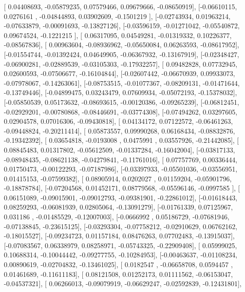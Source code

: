 \documentclass{article}
\begin{document}
       [ 0.04408693, -0.05879235,  0.07579466,  0.09679666, -0.08650919],
       [-0.06610115,  0.0276161 , -0.04844893,  0.03902609, -0.1501219 ],
       [-0.02743934,  0.01963214, -0.07633879, -0.00091693, -0.13827126],
       [-0.03596159, -0.01271042, -0.05540872,  0.09674524, -0.1221215 ],
       [ 0.06317095,  0.04549281, -0.01319332,  0.10226377, -0.08567836],
       [ 0.00963604, -0.08936962, -0.05650084,  0.06263593, -0.08617952],
       [-0.01554744, -0.01392424,  0.04649905, -0.06367932, -0.13167919],
       [-0.02348427, -0.06900281, -0.02889539, -0.03105303, -0.17932257],
       [ 0.09482828,  0.07732945,  0.02600593, -0.07506677, -0.16104844],
       [-0.02607442, -0.06670939,  0.09933073, -0.07978067, -0.14263061],
       [-0.08753515, -0.01077367, -0.08209131, -0.01471644, -0.13749446],
       [-0.04899475,  0.03243479,  0.07609934, -0.05072193, -0.15378032],
       [-0.05850539,  0.05173632, -0.08693615, -0.00120386, -0.09265239],
       [-0.06812451, -0.02929201, -0.00780868, -0.08446691, -0.03774308],
       [-0.07494262,  0.03297605,  0.02904578,  0.07016306, -0.09430818],
       [ 0.04134172,  0.07122572, -0.06461263, -0.09448824, -0.20211414],
       [ 0.05873557,  0.09990268,  0.06168434, -0.08832876, -0.19342392],
       [ 0.03654818, -0.0193008 ,  0.0475991 ,  0.03557926, -0.21442085],
       [ 0.08845483,  0.01317802, -0.05612509, -0.01337284, -0.16042004],
       [-0.03817133, -0.08948435, -0.08621138, -0.04279841, -0.11761016],
       [ 0.07757769,  0.00336444,  0.01750473, -0.00122293, -0.07187986],
       [-0.03397933, -0.05501036, -0.03556951,  0.01415153, -0.07599382],
       [ 0.08905914,  0.0202027 ,  0.01159204, -0.05901796, -0.18878784],
       [-0.07204568,  0.01452171,  0.08779568, -0.05596146, -0.0997585 ],
       [ 0.06151089, -0.09015901, -0.09012793, -0.09381901, -0.22861012],
       [-0.01618443,  0.08259293, -0.06081939,  0.02805064, -0.13091279],
       [-0.01761339,  0.07125967,  0.031186  , -0.01485529, -0.12007003],
       [-0.0666992 ,  0.05186729, -0.07681946, -0.07138845, -0.23615125],
       [-0.03293304, -0.07758212, -0.02910629,  0.06762162, -0.18015527],
       [-0.09234723,  0.01157184,  0.08476263,  0.07702483, -0.13915037],
       [-0.07083567,  0.06338979,  0.08258971, -0.05743325, -0.22909408],
       [ 0.05999025,  0.10688314, -0.10044442, -0.09277755, -0.10284953],
       [-0.00463637, -0.01108234,  0.00890619, -0.02704832, -0.13461025],
       [ 0.0182547 , -0.06658708,  0.0594457 ,  0.01461689, -0.11611183],
       [ 0.08121508,  0.01252173,  0.01111562, -0.06153047, -0.04537321],
       [ 0.06266013, -0.09079919, -0.06629247, -0.02592839, -0.12431801],
\end{document}
